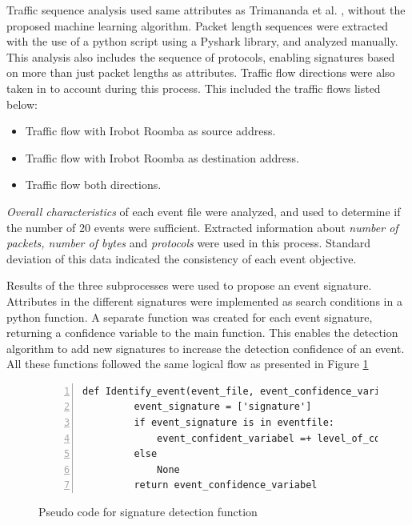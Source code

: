 Traffic sequence analysis used same attributes as Trimananda et al.  \cite{pingpong_trimananda2020packet}, without the proposed machine learning algorithm. Packet length sequences were extracted with the use of a python script using a Pyshark library, and analyzed manually. This analysis also includes the sequence of protocols, enabling signatures based on more than just packet lengths as attributes. Traffic flow directions were also taken in to account during this process. This included the traffic flows listed below: 

\begin{itemize}
    \item Traffic flow with Irobot Roomba as source address.
    \item Traffic flow with Irobot Roomba as destination address.
    \item Traffic flow both directions.
\end{itemize}

\textit{Overall characteristics} of each event file were analyzed, and used to determine if the number of 20 events were sufficient. Extracted information about \textit{number of packets, number of bytes} and \textit{protocols} were used in this process. Standard deviation of this data indicated the consistency of each event objective. 

Results of the three subprocesses were used to propose an event signature. Attributes in the different signatures were implemented as search conditions in a python function. A separate function was created for each event signature, returning a confidence variable to the main function. This enables the detection algorithm to add new signatures to increase the detection confidence of an event. All these functions followed the same logical flow as presented in Figure \ref{fig:Sudo_code_signature_function}

\begin{figure}[H]
    \centering
    \caption{Pseudo code for signature detection function}
    \label{fig:Sudo_code_signature_function}
    \begin{lstlisting}[numbers=left]
     def Identify_event(event_file, event_confidence_variable):
         event_signature = ['signature']
         if event_signature is in eventfile:
             event_confident_variabel =+ level_of_confidece
         else
             None
         return event_confidence_variabel
    \end{lstlisting}
\end{figure}

